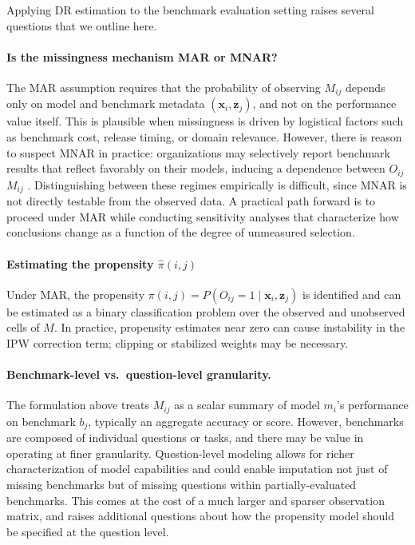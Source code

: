 \documentclass{article}
\begin{document}
Applying DR estimation to the benchmark evaluation setting raises several questions that we outline here.
\paragraph{Is the missingness mechanism MAR or MNAR?}
The MAR assumption requires that the probability of observing $M_{ij}$ depends only on model and benchmark metadata $(\mathbf{x}_i, \mathbf{z}_j)$, and not on the performance value itself. This is plausible when missingness is driven by logistical factors such as benchmark cost, release timing, or domain relevance. However, there is reason to suspect MNAR in practice: organizations may selectively report benchmark results that reflect favorably on their models, inducing a dependence between $O_{ij}$
$M_{ij}$
. Distinguishing between these regimes empirically is difficult, since MNAR is not directly testable from the observed data. A practical path forward is to proceed under MAR while conducting sensitivity analyses that characterize how conclusions change as a function of the degree of unmeasured selection.

\paragraph{Estimating the propensity $\hat{\pi}(i, j)$}
Under MAR, the propensity $\pi(i,j) = P(O_{ij} = 1 \mid \mathbf{x}_i, \mathbf{z}_j)$
is identified and can be estimated as a binary classification problem over the observed and unobserved cells of $M$. In practice, propensity estimates near zero can cause instability in the IPW correction term; clipping or stabilized weights may be necessary.

\paragraph{Benchmark-level vs.\ question-level granularity.}
The formulation above treats $M_{ij}$
as a scalar summary of model $m_i$'s performance on benchmark $b_j$, typically an aggregate accuracy or score. However, benchmarks are composed of individual questions or tasks, and there may be value in operating at finer granularity. Question-level modeling allows for richer characterization of model capabilities and could enable imputation not just of missing benchmarks but of missing questions within partially-evaluated benchmarks. This comes at the cost of a much larger and sparser observation matrix, and raises additional questions about how the propensity model should be specified at the question level.




\end{document}
